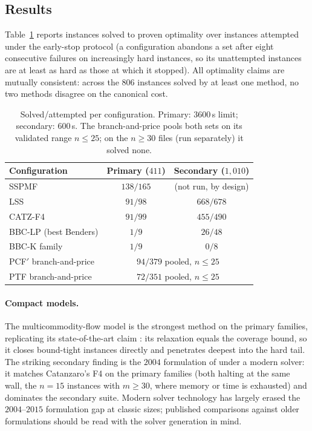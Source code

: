 \documentclass[11pt,a4paper]{article}
\theoremstyle{plain}
\theoremstyle{definition}
\theoremstyle{remark}
\begin{document}
\subsection{Results}\label{ssec:results}
Table~\ref{tab:solves} reports instances solved to proven optimality over
instances attempted under the early-stop protocol (a configuration abandons a
set after eight consecutive failures on increasingly hard instances, so its
unattempted instances are at least as hard as those at which it stopped). All
optimality claims are mutually consistent: across the $806$ instances solved by
at least one method, no two methods disagree on the canonical cost.

\begin{table}[h]\centering
\begin{tabular}{lcc}
\toprule
Configuration & Primary ($411$) & Secondary ($1{,}010$)\\
\midrule
SSPMF                & $138/165$ & (not run, by design)\\
LSS                  & $91/98$   & $668/678$\\
CATZ-F4              & $91/99$   & $455/490$\\
BBC-LP (best Benders)& $1/9$     & $26/48$\\
BBC-K family         & $1/9$     & $0/8$\\
\midrule
PCF$'$ branch-and-price & \multicolumn{2}{c}{$94/379$ pooled, $n\le25$}\\
PTF branch-and-price    & \multicolumn{2}{c}{$72/351$ pooled, $n\le25$}\\
\bottomrule
\end{tabular}
\caption{Solved/attempted per configuration. Primary: $3600$\,s limit;
secondary: $600$\,s. The branch-and-price pools both sets on its validated
range $n\le25$; on the $n\ge30$ files (run separately) it solved none.}
\label{tab:solves}
\end{table}

\paragraph{Compact models.}
The multicommodity-flow model is the strongest method on the primary families,
replicating its state-of-the-art claim \citep{daSilva2024}: its relaxation
equals the coverage bound, so it closes bound-tight instances directly and
penetrates deepest into the hard tail. The striking secondary finding is the
$2004$ formulation of \citet{Laporte2004} under a modern solver: it matches
Catanzaro's F4 on the primary families (both halting at the same wall, the
$n=15$ instances with $m\ge30$, where memory or time is exhausted) and
dominates the secondary suite. Modern solver technology has largely erased the
$2004$--$2015$ formulation gap at classic sizes; published comparisons against
older formulations should be read with the solver generation in mind.
\end{document}
